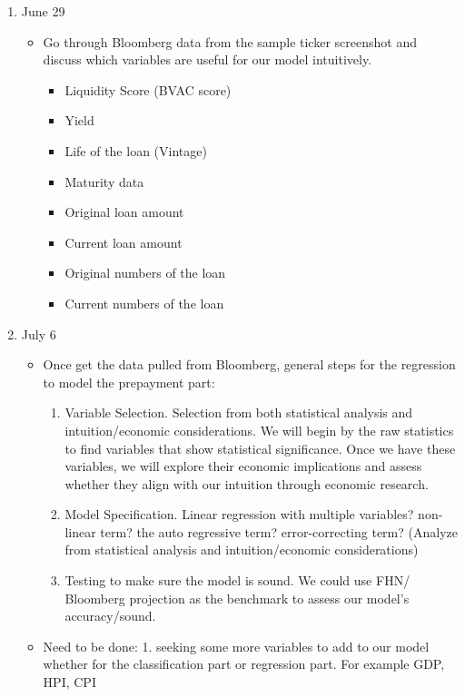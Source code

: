 \begin{enumerate}
    \item June 29
    \begin{itemize}
        \item Go through Bloomberg data from the sample ticker screenshot and discuss which variables are useful for our model intuitively.
        
        \begin{itemize}
            \item Liquidity Score (BVAC score) 
            \item Yield 
            \item Life of the loan (Vintage) 
            \item Maturity data
            \item Original loan amount 
            \item Current loan amount 
            \item Original numbers of the loan
            \item Current numbers of the loan
        \end{itemize}
        
    \end{itemize}
    
    \item July 6
    \begin{itemize}
        \item Once get the data pulled from Bloomberg, general steps for the regression to model the prepayment part:
        
        \begin{enumerate}
            \item Variable Selection. Selection from both statistical analysis and intuition/economic considerations. We will begin by the raw statistics to find variables that show statistical significance. Once we have these variables, we will explore their economic implications and assess whether they align with our intuition through economic research.
            \item Model Specification. Linear regression with multiple variables? non-linear term? the auto regressive term? error-correcting term? (Analyze from statistical analysis and intuition/economic considerations)
            \item Testing to make sure the model is sound. We could use FHN/ Bloomberg projection as the benchmark to assess our model's accuracy/sound.
        \end{enumerate}

        
        \item Need to be done: 1. seeking some more variables to add to our model whether for the classification part or regression part.
        For example GDP, HPI, CPI
        \newline

        
    \end{itemize}

\end{enumerate}